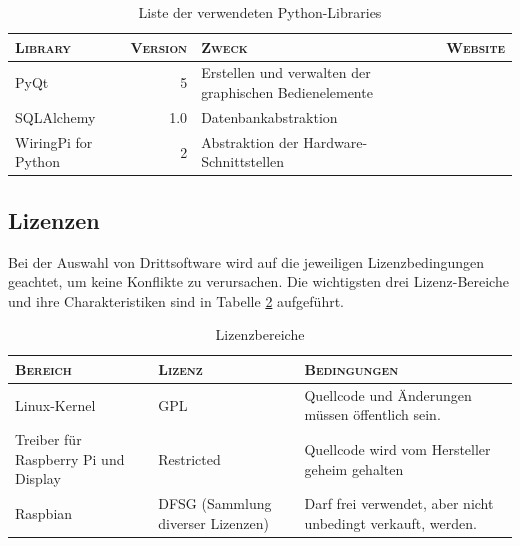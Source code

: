 \begin{table}[h!tb]
    \centering
    \caption{Liste der verwendeten Python-Libraries}
    \label{tab:pythonLibs}
    \small
    \begin{tabular}{lrp{50mm}r}
        \toprule
        \textsc{Library} & \textsc{Version} & \textsc{Zweck} & \textsc{Website} \\
        \midrule
        PyQt & 5 & Erstellen und verwalten der graphischen Bedienelemente & \cite{ref:pyqt} \\
        [5mm]
        \rowcolor{solarized-base2}
        SQLAlchemy & 1.0 & Datenbankabstraktion                           & \cite{ref:sqlalchemy} \\
        [5mm]
        WiringPi for Python & 2 & Abstraktion der Hardware-Schnittstellen & \cite{ref:wiringpi} \\
        \bottomrule
    \end{tabular}
\end{table}

\clearpage
\subsection{Lizenzen}
\label{subsec:software:master:licenses}

Bei    der   Auswahl    von    Drittsoftware   wird    auf   die    jeweiligen
Lizenzbedingungen   geachtet,   um   keine   Konflikte   zu   verursachen. Die
wichtigsten  drei Lizenz-Bereiche  und ihre  Charakteristiken sind  in Tabelle
\ref{tab:licenseAreas} aufgef\"uhrt.

\begin{table}[h!tb]
    \centering
    \caption{Lizenzbereiche}
    \label{tab:licenseAreas}
    \small
    \begin{tabular}{>{\raggedright}p{30mm}>{\raggedright}p{30mm}p{50mm}}
        \toprule
        \textsc{Bereich} &
        \textsc{Lizenz} &
        \textsc{Bedingungen} \\
        \midrule
        Linux-Kernel &
        GPL &
        Quellcode und \"Anderungen m\"ussen \"offentlich sein. \\
        [3mm]

        \rowcolor{solarized-base2}
        Treiber f\"ur Raspberry Pi und Display &
        Restricted &
        Quellcode wird vom Hersteller geheim gehalten \\
        [8mm]

        Raspbian &
        DFSG (Sammlung diverser Lizenzen) &
        Darf frei verwendet, aber nicht unbedingt verkauft, werden. \\
        \bottomrule
    \end{tabular}
\end{table}

